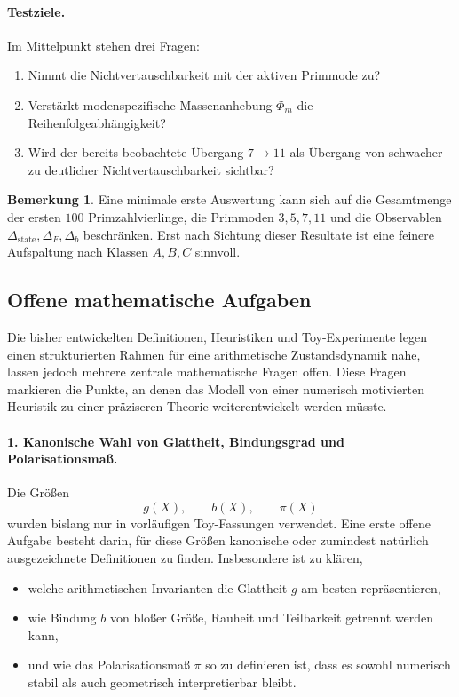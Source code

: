 \documentclass[11pt,a4paper]{article}
\theoremstyle{definition}
\newtheorem{bemerkung}{Bemerkung}
\begin{document}
\paragraph{Testziele.}
Im Mittelpunkt stehen drei Fragen:
\begin{enumerate}
	\item Nimmt die Nichtvertauschbarkeit mit der aktiven Primmode zu?
	\item Verstärkt modenspezifische Massenanhebung \(\Phi_m\) die Reihenfolgeabhängigkeit?
	\item Wird der bereits beobachtete Übergang \(7\to 11\) als Übergang von schwacher zu deutlicher Nichtvertauschbarkeit sichtbar?
\end{enumerate}

\begin{bemerkung}
	Eine minimale erste Auswertung kann sich auf die Gesamtmenge der ersten \(100\) Primzahlvierlinge, die Primmoden \(3,5,7,11\) und die Observablen \(\Delta_{\mathrm{state}},\Delta_F,\Delta_b\) beschränken. Erst nach Sichtung dieser Resultate ist eine feinere Aufspaltung nach Klassen \(A,B,C\) sinnvoll.
\end{bemerkung}
\subsection{Offene mathematische Aufgaben}

Die bisher entwickelten Definitionen, Heuristiken und Toy-Experimente legen einen strukturierten Rahmen für eine arithmetische Zustandsdynamik nahe, lassen jedoch mehrere zentrale mathematische Fragen offen. Diese Fragen markieren die Punkte, an denen das Modell von einer numerisch motivierten Heuristik zu einer präziseren Theorie weiterentwickelt werden müsste.

\paragraph{1. Kanonische Wahl von Glattheit, Bindungsgrad und Polarisationsmaß.}
Die Größen
\[
g(X),\qquad b(X),\qquad \pi(X)
\]
wurden bislang nur in vorläufigen Toy-Fassungen verwendet. Eine erste offene Aufgabe besteht darin, für diese Größen kanonische oder zumindest natürlich ausgezeichnete Definitionen zu finden. Insbesondere ist zu klären,
\begin{itemize}
	\item welche arithmetischen Invarianten die Glattheit \(g\) am besten repräsentieren,
	\item wie Bindung \(b\) von bloßer Größe, Rauheit und Teilbarkeit getrennt werden kann,
	\item und wie das Polarisationsmaß \(\pi\) so zu definieren ist, dass es sowohl numerisch stabil als auch geometrisch interpretierbar bleibt.
\end{itemize}
\end{document}

